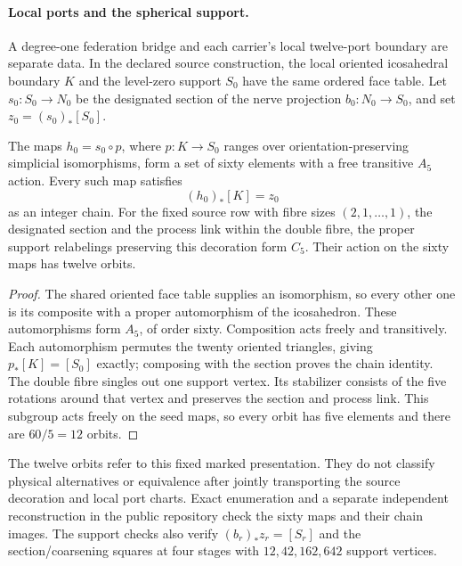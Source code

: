 \paragraph{Local ports and the spherical support.}
A degree-one federation bridge and each carrier's local twelve-port boundary
are separate data. In the declared source construction, the local oriented
icosahedral boundary \(K\) and the level-zero support \(S_0\) have the same
ordered face table. Let \(s_0:S_0\to N_0\) be the designated section of the
nerve projection \(b_0:N_0\to S_0\), and set
\(z_0=(s_0)_*[S_0]\).

\begin{proposition}
\label{prop:port-support-seed-attachments}
The maps \(h_0=s_0\circ p\), where \(p:K\to S_0\) ranges over
orientation-preserving simplicial isomorphisms, form a set of sixty elements
with a free transitive \(A_5\) action. Every such map satisfies
\[
 (h_0)_*[K]=z_0
\]
as an integer chain. For the fixed source row with fibre sizes
\((2,1,\ldots,1)\), the designated section and the process link within the
double fibre, the proper support relabelings preserving this decoration
form \(C_5\). Their action on the sixty maps has twelve orbits.
\end{proposition}

\begin{proof}
The shared oriented face table supplies an isomorphism, so every other one
is its composite with a proper automorphism of the icosahedron. These
automorphisms form \(A_5\), of order sixty. Composition acts freely and
transitively. Each automorphism permutes the twenty oriented triangles,
giving \(p_*[K]=[S_0]\) exactly; composing with the section proves the
chain identity. The double fibre singles out one support vertex. Its
stabilizer consists of the five rotations around that vertex and preserves
the section and process link. This subgroup acts freely on the seed maps,
so every orbit has five elements and there are \(60/5=12\) orbits.
\end{proof}

The twelve orbits refer to this fixed marked presentation. They do not
classify physical alternatives or equivalence after jointly transporting
the source decoration and local port charts. Exact enumeration and a
separate independent reconstruction in the public repository check the
sixty maps and their chain images. The support checks also verify \((b_r)_*z_r=[S_r]\) and the section/coarsening
squares at four stages with \(12,42,162,642\) support vertices.

